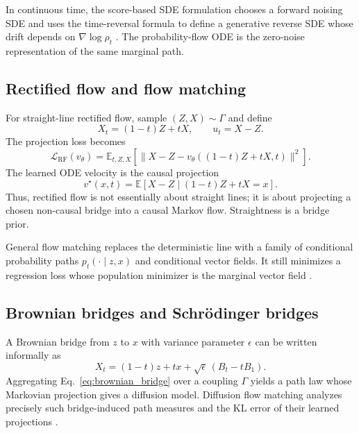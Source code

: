 \documentclass[twoside,11pt]{jmlr}
\numberwithin{equation}{section}
\newcommand{\E}{\mathbb{E}}
\begin{document}
In continuous time, the score-based SDE formulation chooses a forward noising SDE and uses the time-reversal formula to define a generative reverse SDE whose drift depends on $\nabla\log\rho_t$ \citep{song2021score}. The probability-flow ODE is the zero-noise representation of the same marginal path.

\subsection{Rectified flow and flow matching}

For straight-line rectified flow, sample $(Z,X)\sim\Gamma$ and define
\begin{equation}
    X_t=(1-t)Z+tX,
    \qquad u_t=X-Z.
\end{equation}
The projection loss becomes
\begin{equation}
    \mathcal L_{\mathrm{RF}}(v_\theta)
    =\E_{t,Z,X}\left[\|X-Z-v_\theta((1-t)Z+tX,t)\|^2\right].
    \label{eq:rf_loss}
\end{equation}
The learned ODE velocity is the causal projection
\begin{equation}
    v^\star(x,t)=\E[X-Z\mid (1-t)Z+tX=x].
\end{equation}
Thus, rectified flow is not essentially about straight lines; it is about projecting a chosen non-causal bridge into a causal Markov flow. Straightness is a bridge prior.

General flow matching replaces the deterministic line with a family of conditional probability paths $p_t(\cdot\mid z,x)$ and conditional vector fields. It still minimizes a regression loss whose population minimizer is the marginal vector field \citep{lipman2023flow,tong2024cfm}.

\subsection{Brownian bridges and Schr\"odinger bridges}

A Brownian bridge from $z$ to $x$ with variance parameter $\epsilon$ can be written informally as
\begin{equation}
    X_t=(1-t)z+t x+\sqrt{\epsilon}\,(B_t-tB_1).
    \label{eq:brownian_bridge}
\end{equation}
Aggregating Eq.~\eqref{eq:brownian_bridge} over a coupling $\Gamma$ yields a path law whose Markovian projection gives a diffusion model. Diffusion flow matching analyzes precisely such bridge-induced path measures and the KL error of their learned projections \citep{silveri2024dfm}.
\end{document}
